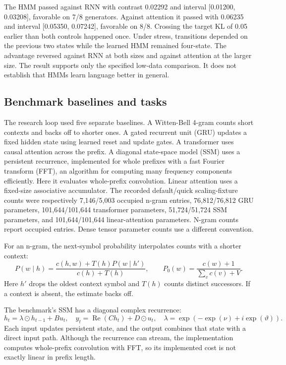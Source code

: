 The HMM passed against RNN with contrast 0.02292 and interval [0.01200, 0.03208], favorable on 7/8 generators. Against attention it passed with 0.06235 and interval [0.05350, 0.07242], favorable on 8/8. Crossing the target KL of 0.05 earlier than both controls happened once. Under stress, transitions depended on the previous two states while the learned HMM remained four-state. The advantage reversed against RNN at both sizes and against attention at the larger size. The result supports only the specified low-data comparison. It does not establish that HMMs learn language better in general.

\subsection{Benchmark baselines and tasks}

The research loop used five separate baselines. A Witten-Bell 4-gram counts short contexts and backs off to shorter ones. A gated recurrent unit (GRU) updates a fixed hidden state using learned reset and update gates. A transformer uses causal attention across the prefix. A diagonal state-space model (SSM) uses a persistent recurrence, implemented for whole prefixes with a fast Fourier transform (FFT), an algorithm for computing many frequency components efficiently. Here it evaluates whole-prefix convolution. Linear attention uses a fixed-size associative accumulator. The recorded default/quick scaling-fixture counts were respectively 7,146/5,003 occupied n-gram entries, 76,812/76,812 GRU parameters, 101,644/101,644 transformer parameters, 51,724/51,724 SSM parameters, and 101,644/101,644 linear-attention parameters. N-gram counts report occupied entries. Dense tensor parameter counts use a different convention.

For an n-gram, the next-symbol probability interpolates counts with a shorter context:
\begin{equation}
P(w\mid h)=\frac{c(h,w)+T(h)P(w\mid h')}{c(h)+T(h)},\qquad P_0(w)=\frac{c(w)+1}{\sum_vc(v)+V}.
\end{equation}
Here $h'$ drops the oldest context symbol and $T(h)$ counts distinct successors. If a context is absent, the estimate backs off.

The benchmark's SSM has a diagonal complex recurrence:
\begin{equation}
h_t=\lambda\odot h_{t-1}+Bu_t,\quad y_t=\operatorname{Re}(Ch_t)+D\odot u_t,\quad \lambda=\exp(-\exp(\nu)+i\exp(\vartheta)).
\end{equation}
Each input updates persistent state, and the output combines that state with a direct input path. Although the recurrence can stream, the implementation computes whole-prefix convolution with FFT, so its implemented cost is not exactly linear in prefix length.

